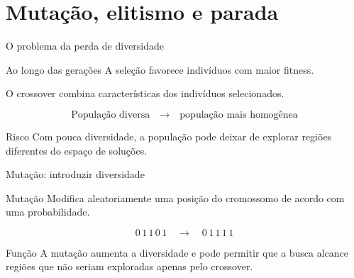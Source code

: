 \documentclass[xcolor=dvipsnames,table]{beamer}
\begin{document}
\section{Mutação, elitismo e parada}

\begin{frame}{O problema da perda de diversidade}

    \begin{block}{Ao longo das gerações}
        A seleção favorece indivíduos com maior fitness.

        \medskip

        O crossover combina características dos indivíduos
        selecionados.
    \end{block}

    \begin{center}
        \Large
        \[
        \text{População diversa}
        \quad\longrightarrow\quad
        \text{população mais homogênea}
        \]
    \end{center}

    \begin{block}{Risco}
        Com pouca diversidade, a população pode deixar de explorar
        regiões diferentes do espaço de soluções.
    \end{block}

\end{frame}

\begin{frame}{Mutação: introduzir diversidade}

    \begin{block}{Mutação}
        Modifica aleatoriamente uma posição do cromossomo
        de acordo com uma probabilidade.
    \end{block}

    \begin{center}
        \Large
        \[
        0\,1\,1\,\boxed{0}\,1
        \quad\longrightarrow\quad
        0\,1\,1\,\boxed{1}\,1
        \]
    \end{center}

    \begin{block}{Função}
        A mutação aumenta a diversidade e pode permitir que a busca
        alcance regiões que não seriam exploradas apenas pelo crossover.
    \end{block}

\end{frame}
\end{document}
